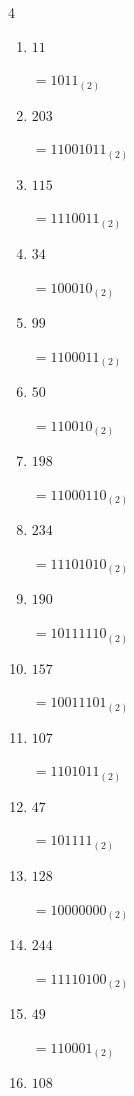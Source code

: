 \begin{multicols}{4}
\begin{enumerate}
        $=10011001_{(2)}$

  \item $11$

        $=1011_{(2)}$

\columnbreak %

\resetques

  \item $203$

        $=11001011_{(2)}$

  \item $115$

        $=1110011_{(2)}$

  \item $34$

        $=100010_{(2)}$

  \item $99$

        $=1100011_{(2)}$

  \item $50$

        $=110010_{(2)}$

  \item $198$

        $=11000110_{(2)}$

  \item $234$

        $=11101010_{(2)}$

  \item $190$

        $=10111110_{(2)}$

  \item $157$

        $=10011101_{(2)}$

  \item $107$

        $=1101011_{(2)}$

  \item $47$

        $=101111_{(2)}$

  \item $128$

        $=10000000_{(2)}$

  \item $244$

        $=11110100_{(2)}$

  \item $49$

        $=110001_{(2)}$

  \item $108$


\end{enumerate}
\end{multicols}
